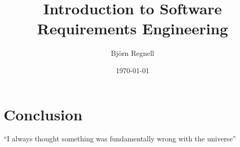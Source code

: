 \documentclass[a4paper]{nicebook}
\title{
\bf\sffamily\fontsize{30}{40}\selectfont
Introduction to Software Requirements Engineering
}
\author{Björn Regnell}
\date{\today}
\begin{document}
\frontmatter
\maketitle



\setcounter{tocdepth}{2}
\tableofcontents
\mainmatter
{}









\chapter{Conclusion}
``I always thought something was fundamentally wrong with the universe'' \cite{adams1995hitchhiker}







\end{document}
